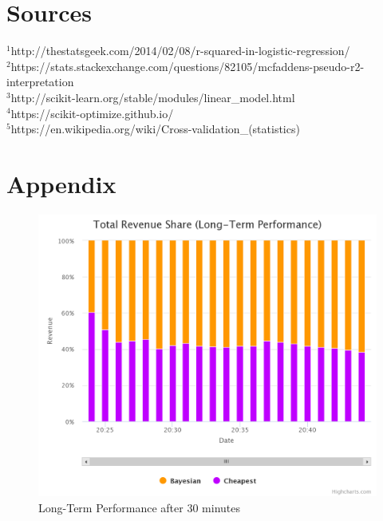 \documentclass[sigconf]{acmart}
\begin{document}
\newpage
\section*{Sources}
$^1$http://thestatsgeek.com/2014/02/08/r-squared-in-logistic-regression/\\
$^2$https://stats.stackexchange.com/questions/82105/mcfaddens-pseudo-r2-interpretation\\
$^3$http://scikit-learn.org/stable/modules/linear\_model.html\\
$^4$https://scikit-optimize.github.io/\\
$^5$https://en.wikipedia.org/wiki/Cross-validation\_(statistics)
\newpage
\section*{Appendix}
\begin{figure}[!htb]
  \includegraphics[width=\columnwidth]{pictures/lt_25.png}
  \caption{Long-Term Performance after 30 minutes}
  \label{fig:lt_25}
\end{figure}
\end{document}

